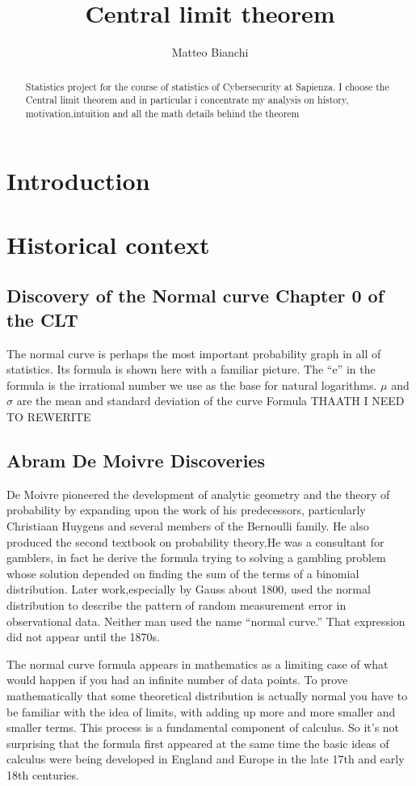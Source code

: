 \documentclass{article}
\title{Central limit theorem}
\author{Matteo Bianchi}
\begin{document}
\maketitle

\begin{abstract}
Statistics project for the course of statistics of Cybersecurity at Sapienza.
I choose the Central limit theorem and in particular i concentrate my analysis  on  history, motivation,intuition and  all the math details behind the theorem
\end{abstract}

\section{Introduction}

\section{Historical context}
\subsection{Discovery of the Normal curve Chapter 0 of the CLT}
The normal curve is perhaps the most important probability graph in all of statistics.
Its formula is shown here with a
familiar picture. The “e” in the formula
is the irrational number we use as the
  base for natural logarithms. $ \mu $ and $ \sigma $ are
the mean and standard deviation of the
curve
Formula THAATH I NEED TO REWERITE
\subsection{Abram De Moivre Discoveries}
De Moivre pioneered the development of analytic geometry and the theory of probability by expanding upon the work of his predecessors, particularly Christiaan Huygens and several members of the Bernoulli family. He also produced the second textbook on probability theory.He was a consultant for  gamblers, in fact he derive the formula trying to  solving a gambling
problem whose solution depended on finding the sum of the terms of a binomial distribution. Later work,especially by Gauss about 1800, used the normal distribution to describe the pattern of random
measurement error in observational data. Neither man used the name “normal curve.” That expression did not appear until the 1870s.


The normal curve formula appears in mathematics as a limiting case of what would happen if you had an
infinite number of data points. To prove mathematically that some theoretical distribution is actually
normal you have to be familiar with the idea of limits, with adding up more and more smaller and smaller
terms. This process is a fundamental component of calculus. So it’s not surprising that the formula first
appeared at the same time the basic ideas of calculus were being developed in England and Europe in the
late 17th and early 18th centuries.
\end{document}
